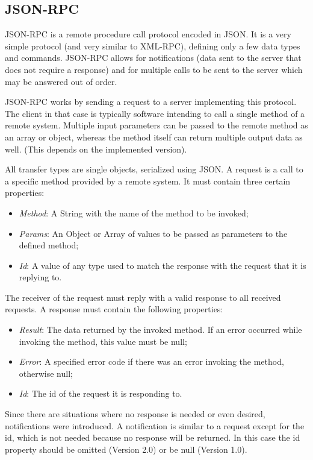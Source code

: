 \subsection{JSON-RPC}
\label{jsonrpc}
JSON-RPC \cite{json2012json} is a remote procedure call protocol encoded in JSON. It is a very simple protocol (and very similar to XML-RPC), defining only a few data types and commands. JSON-RPC allows for notifications (data sent to the server that does not require a response) and for multiple calls to be sent to the server which may be answered out of order.

JSON-RPC works by sending a request to a server implementing this protocol. The client in that case is typically software intending to call a single method of a remote system. Multiple input parameters can be passed to the remote method as an array or object, whereas the method itself can return multiple output data as well. (This depends on the implemented version).

All transfer types are single objects, serialized using JSON. A request is a call to a specific method provided by a remote system. It must contain three certain properties:
\begin{itemize}
    \item \textit{Method}: A String with the name of the method to be invoked;
    \item \textit{Params}: An Object or Array of values to be passed as parameters to the defined method;
    \item \textit{Id}: A value of any type used to match the response with the request that it is replying to.
\end{itemize}

The receiver of the request must reply with a valid response to all received requests. A response must contain the following properties:
\begin{itemize}
    \item \textit{Result}: The data returned by the invoked method. If an error occurred while invoking the method, this value must be null;
    \item \textit{Error}: A specified error code if there was an error invoking the method, otherwise null;
    \item \textit{Id}: The id of the request it is responding to.
\end{itemize}
Since there are situations where no response is needed or even desired, notifications were introduced. A notification is similar to a request except for the id, which is not needed because no response will be returned. In this case the id property should be omitted (Version 2.0) or be null (Version 1.0).
